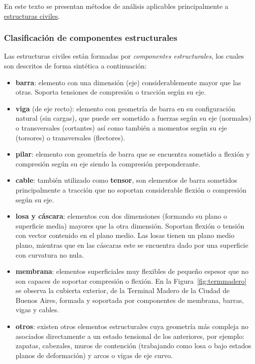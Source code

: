 En este texto se presentan métodos de análisis aplicables principalmente a \underline{estructuras civiles}.









\subsubsection{Clasificación de componentes estructurales}

Las estructuras civiles están formadas por \textit{componentes estructurales}, los cuales son descritos de forma sintética a continuación:
%
\begin{itemize}
	\item \textbf{barra}: elemento con una dimensión (eje) considerablemente mayor que las otras. Soporta tensiones de compresión o tracción según su eje.
	\item \textbf{viga } (de eje recto): elemento con geometría de barra en su configuración natural (sin cargas), que puede ser sometido a fuerzas según su eje (normales) o transversales (cortantes) así como también a momentos según su eje (torsores) o transversales (flectores).
	\item \textbf{pilar}: elemento con geometría de barra que se encuentra sometido a flexión y compresión según su eje siendo la compresión preponderante.
	\item \textbf{cable}: también utilizado como \textbf{tensor}, son elementos de barra sometidos principalmente a tracción que no soportan considerable flexión o compresión según su eje.
	\item \textbf{losa y cáscara}: elementos con dos dimensiones (formando su plano o superficie media) mayores que la otra dimensión. %
	Soportan flexión o tensión con vector contenido en el plano medio. %
	Las losas tienen un plano medio plano, mientras que en las cáscaras este se encuentra dado por una superficie con curvatura no nula.
	\item \textbf{membrana}: elementos superficiales muy flexibles de pequeño espesor que no son capaces de soportar compresión o flexión. %
	En la Figura~\ref{fig:termmadero} se observa la cubierta exterior, de la Terminal Madero de la Ciudad de Buenos Aires, formada y soportada por componentes de membrana, barras, vigas y cables.
	\item \textbf{otros}: existen otros elementos estructurales cuya geometría más compleja no asociados directamente a un estado tensional de los anteriores, por ejemplo: zapatas, cabezales, muros de contención (trabajando como losa o bajo estados planos de deformación) y arcos o vigas de eje curvo.
\end{itemize}

